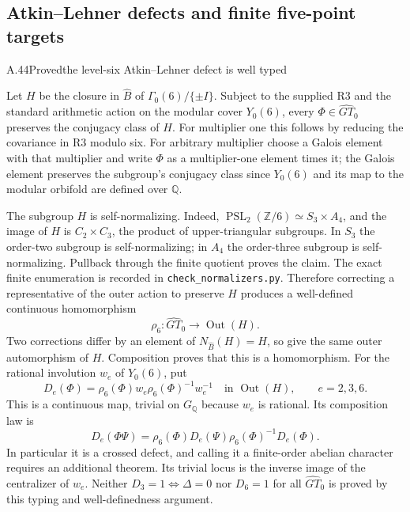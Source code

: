 \subsection{Atkin--Lehner defects and finite five-point targets}


\begin{statement}{A.44}{Proved}{the level-six Atkin--Lehner defect is well typed}
\end{statement}
Let $H$ be the closure in $\widehat B$ of
$\Gamma_0(6)/\{\pm I\}$. Subject to the supplied R3 and the standard
arithmetic action on the modular cover $Y_0(6)$, every
$\Phi\in\widehat{GT}_0$ preserves the conjugacy class of $H$.
For multiplier one this follows by reducing the covariance in R3 modulo
six. For arbitrary multiplier choose a Galois element with that multiplier
and write $\Phi$ as a multiplier-one element times it; the Galois element
preserves the subgroup's conjugacy class since $Y_0(6)$ and its map to the
modular orbifold are defined over $\mathbb Q$.

The subgroup $H$ is self-normalizing. Indeed,
$\operatorname{PSL}_2(\mathbb Z/6)\simeq S_3\times A_4$, and the image
of $H$ is $C_2\times C_3$, the product of upper-triangular subgroups.
In $S_3$ the order-two subgroup is self-normalizing; in $A_4$ the
order-three subgroup is self-normalizing. Pullback through the finite
quotient proves the claim. The exact finite enumeration is recorded in
\texttt{check\_normalizers.py}.
Therefore correcting a representative of the outer action to preserve
$H$ produces a well-defined continuous homomorphism
\[
 \rho_6:\widehat{GT}_0\longrightarrow\operatorname{Out}(H).
\]
Two corrections differ by an element of $N_{\widehat B}(H)=H$, so give
the same outer automorphism of $H$. Composition proves that this is a
homomorphism.
For the rational involution $w_e$ of $Y_0(6)$, put
\[
 D_e(\Phi)=\rho_6(\Phi)w_e\rho_6(\Phi)^{-1}w_e^{-1}
 \quad\text{in }\operatorname{Out}(H),\qquad e=2,3,6.
\]
This is a continuous map, trivial on $G_{\mathbb Q}$ because $w_e$ is
rational. Its composition law is
\[
 D_e(\Phi\Psi)=
 \rho_6(\Phi)D_e(\Psi)\rho_6(\Phi)^{-1}D_e(\Phi).
\]
In particular it is a crossed defect, and calling it a finite-order
abelian character requires an additional theorem. Its trivial locus is
the inverse image of the centralizer of $w_e$. Neither
$D_3=1\Longleftrightarrow\Delta=0$ nor $D_6=1$ for all
$\widehat{GT}_0$ is proved by this typing and well-definedness argument.

